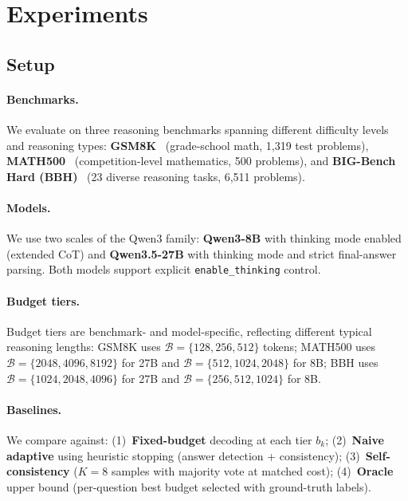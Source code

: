 \section{Experiments}
\label{sec:experiments}

\subsection{Setup}
\label{sec:exp:setup}

\paragraph{Benchmarks.}
We evaluate on three reasoning benchmarks spanning different difficulty levels and reasoning types:
\textbf{GSM8K}~\citep{cobbe2021training} (grade-school math, 1,319 test problems),
\textbf{MATH500}~\citep{hendrycks2021measuring} (competition-level mathematics, 500 problems), and
\textbf{BIG-Bench Hard (BBH)}~\citep{suzgun2023challenging} (23 diverse reasoning tasks, 6,511 problems).

\paragraph{Models.}
We use two scales of the Qwen3 family: \textbf{Qwen3-8B} with thinking mode enabled (extended CoT) and \textbf{Qwen3.5-27B} with thinking mode and strict final-answer parsing.
Both models support explicit \texttt{enable\_thinking} control.

\paragraph{Budget tiers.}
Budget tiers are benchmark- and model-specific, reflecting different typical reasoning lengths:
GSM8K uses $\mathcal{B} = \{128, 256, 512\}$ tokens;
MATH500 uses $\mathcal{B} = \{2048, 4096, 8192\}$ for 27B and $\mathcal{B} = \{512, 1024, 2048\}$ for 8B;
BBH uses $\mathcal{B} = \{1024, 2048, 4096\}$ for 27B and $\mathcal{B} = \{256, 512, 1024\}$ for 8B.

\paragraph{Baselines.}
We compare against: (1)~\textbf{Fixed-budget} decoding at each tier $b_k$; (2)~\textbf{Naive adaptive} using heuristic stopping (answer detection + consistency); (3)~\textbf{Self-consistency} ($K=8$ samples with majority vote at matched cost); (4)~\textbf{Oracle} upper bound (per-question best budget selected with ground-truth labels).

